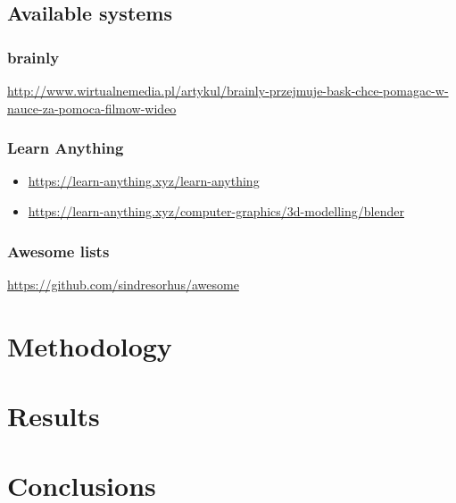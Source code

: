 \documentclass{report}
\begin{document}
\section{Available systems}

\subsection{brainly}

\url{http://www.wirtualnemedia.pl/artykul/brainly-przejmuje-bask-chce-pomagac-w-nauce-za-pomoca-filmow-wideo}

\subsection{Learn Anything}
\begin{itemize}
    \item \url{https://learn-anything.xyz/learn-anything}
    \item \url{https://learn-anything.xyz/computer-graphics/3d-modelling/blender}
\end{itemize}

\subsection{Awesome lists}
\url{https://github.com/sindresorhus/awesome}

\chapter{Methodology}
\chapter{Results}
\chapter{Conclusions}



\listoffigures
\listoftables
\end{document}
